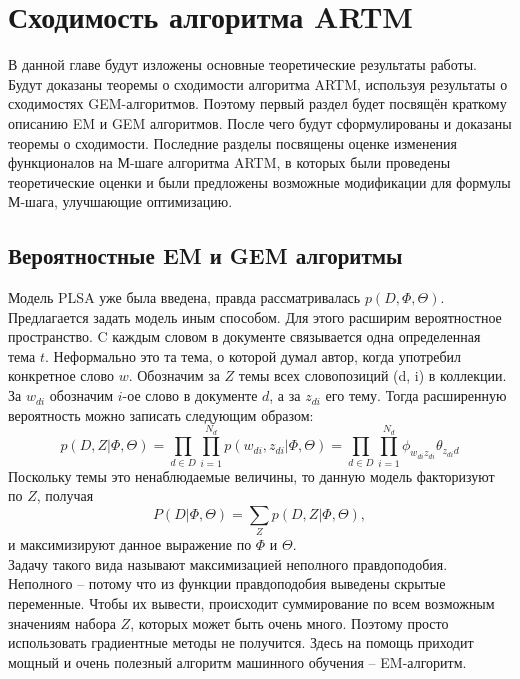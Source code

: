 \documentclass[12pt]{article}
\begin{document}
	\section{Сходимость алгоритма ARTM}
	В данной главе будут изложены основные теоретические результаты работы. Будут доказаны теоремы о сходимости алгоритма ARTM, используя результаты о сходимостях GEM-алгоритмов. Поэтому первый раздел будет посвящён краткому описанию EM и GEM алгоритмов. После чего будут сформулированы и доказаны теоремы о сходимости. Последние разделы посвящены оценке изменения функционалов на М-шаге алгоритма ARTM, в которых были проведены теоретические оценки и были предложены возможные модификации для формулы М-шага, улучшающие оптимизацию. 
	\subsection{Вероятностные EM и GEM алгоритмы}
Модель PLSA уже была введена, правда рассматривалась $p(D,\Phi,\Theta)$. Предлагается задать модель иным способом. Для этого расширим вероятностное пространство. C каждым словом в документе связывается одна определенная тема $t$. Неформально это та тема, о которой думал автор, когда употребил конкретное слово $w$. Обозначим за $Z$ темы всех словопозиций (d, i) в коллекции. За $w_{di}$ обозначим $i$-ое слово в документе $d$, а за $z_{di}$ его тему. Тогда расширенную вероятность можно записать следующим образом:
\[
p(D, Z|\Phi, \Theta) = \prod\limits_{d \in D} \prod\limits_{i=1}^{N_d} p(w_{di}, z_{di}|\Phi, \Theta) = \prod\limits_{d \in D} \prod\limits_{i=1}^{N_d} \phi_{w_{di}z_{di}}\theta_{z_{di}d}
\]
Поскольку темы это ненаблюдаемые величины, то данную модель факторизуют по $Z$, получая
\[
P(D|\Phi,\Theta ) = \sum\limits_Z p(D, Z|\Phi, \Theta),
\]
и максимизируют данное выражение по $\Phi$ и $\Theta$.\\
Задачу такого вида называют максимизацией неполного правдоподобия. Неполного – потому что из функции правдоподобия выведены скрытые переменные. Чтобы их вывести, происходит суммирование по всем возможным значениям набора $Z$, которых может быть очень много. Поэтому просто использовать градиентные методы не получится. Здесь на помощь приходит мощный и очень полезный алгоритм машинного обучения -- EM-алгоритм.
\end{document}
